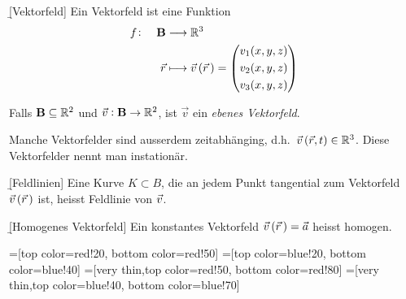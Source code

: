 \documentclass[12pt]{article}
\begin{document}
\begin{defn}{\b{[Vektorfeld]}} Ein Vektorfeld ist eine Funktion
    \begin{align}
        f\colon\quad \mathbf{B} & \longrightarrow\mathbb{R}^3                                \\
        \vec{r}                 & \longmapsto \vec{v}\,(\vec{r}\,)=\begin{pmatrix}
                                                                       v_1(x,y,z) \\[3pt]
                                                                       v_2(x,y,z) \\[3pt]
                                                                       v_3(x,y,z)
                                                                   \end{pmatrix}
    \end{align}
    \begin{rmk}{}{}
        Falls  $\mathbf{B}\subseteq\mathbb{R}^2$ und $\vec{v}: \mathbf{B}\to\mathbb{R}^2$, ist $\vec{v}$ ein \emph{ebenes Vektorfeld}.
    \end{rmk}
    \begin{rmk}{}{}
        Manche Vektorfelder sind ausserdem zeitabhänging, d.h.\ $\vec{v}\,(\vec{r},t)\in\mathbb{R}^3$. Diese Vektorfelder nennt man instationär.
    \end{rmk}
\end{defn}\vspace*{1em}

\begin{defn}{\b{[Feldlinien]}}
    Eine Kurve $K\subset{B}$, die an jedem Punkt tangential zum Vektorfeld $\vec{v}\,(\vec{r}\,)$ ist, heisst Feldlinie von $\vec{v}$.
\end{defn}\vspace*{1em}

\begin{defn}{\b{[Homogenes Vektorfeld]}} Ein konstantes Vektorfeld $\vec{v}\,(\vec{r}\,)=\vec{a}$ heisst homogen.
\end{defn}

=[top color=red!20, bottom color=red!50]
=[top color=blue!20, bottom color=blue!40]
=[very thin,top color=red!50, bottom color=red!80]
=[very thin,top color=blue!40, bottom color=blue!70]
\end{document}
